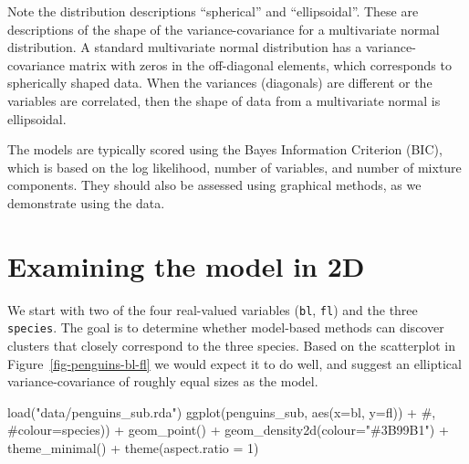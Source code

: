 \documentclass[
  letterpaper,
]{book}
\newenvironment{Shaded}{\begin{snugshade}}{\end{snugshade}}
\newcommand{\AttributeTok}[1]{\textcolor[rgb]{0.40,0.45,0.13}{#1}}
\newcommand{\CommentTok}[1]{\textcolor[rgb]{0.37,0.37,0.37}{#1}}
\newcommand{\DecValTok}[1]{\textcolor[rgb]{0.68,0.00,0.00}{#1}}
\newcommand{\FunctionTok}[1]{\textcolor[rgb]{0.28,0.35,0.67}{#1}}
\newcommand{\NormalTok}[1]{\textcolor[rgb]{0.00,0.23,0.31}{#1}}
\newcommand{\SpecialCharTok}[1]{\textcolor[rgb]{0.37,0.37,0.37}{#1}}
\newcommand{\StringTok}[1]{\textcolor[rgb]{0.13,0.47,0.30}{#1}}
\begin{document}
\noindent Note the distribution descriptions ``spherical'' and
``ellipsoidal''. These are descriptions of the shape of the
variance-covariance for a multivariate normal distribution. A standard
multivariate normal distribution has a variance-covariance matrix with
zeros in the off-diagonal elements, which corresponds to spherically
shaped data. When the variances (diagonals) are different or the
variables are correlated, then the shape of data from a multivariate
normal is ellipsoidal.


The models are typically scored using the Bayes Information Criterion
(BIC), which is based on the log likelihood, number of variables, and
number of mixture components. They should also be assessed using
graphical methods, as we demonstrate using the  data.

\hypertarget{examining-the-model-in-2d}{%
\section{Examining the model in 2D}\label{examining-the-model-in-2d}}

We start with two of the four real-valued variables (\texttt{bl},
\texttt{fl}) and the three \texttt{species}. The goal is to determine
whether model-based methods can discover clusters that closely
correspond to the three species. Based on the scatterplot in
Figure~\ref{fig-penguins-bl-fl} we would expect it to do well, and
suggest an elliptical variance-covariance of roughly equal sizes as the
model.

\begin{Shaded}
\begin{Highlighting}[]
\FunctionTok{load}\NormalTok{(}\StringTok{"data/penguins\_sub.rda"}\NormalTok{)}
\FunctionTok{ggplot}\NormalTok{(penguins\_sub, }\FunctionTok{aes}\NormalTok{(}\AttributeTok{x=}\NormalTok{bl, }
                         \AttributeTok{y=}\NormalTok{fl)) }\SpecialCharTok{+} \CommentTok{\#, }
                         \CommentTok{\#colour=species)) +}
  \FunctionTok{geom\_point}\NormalTok{() }\SpecialCharTok{+}
  \FunctionTok{geom\_density2d}\NormalTok{(}\AttributeTok{colour=}\StringTok{"\#3B99B1"}\NormalTok{) }\SpecialCharTok{+}
  \FunctionTok{theme\_minimal}\NormalTok{() }\SpecialCharTok{+}
  \FunctionTok{theme}\NormalTok{(}\AttributeTok{aspect.ratio =} \DecValTok{1}\NormalTok{)}
\end{Highlighting}
\end{Shaded}
\end{document}
